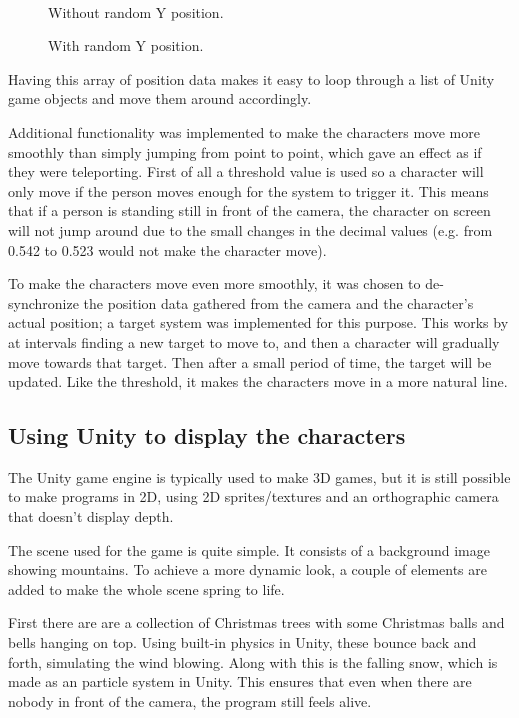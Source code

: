 \begin{figure}[htbp]
\begin{minipage}[b]{0.45\textwidth}
\end{minipage} \\ %
\begin{minipage}[t]{0.45\textwidth}
\caption{Without random Y position.} %
\label{fig:withoutRandomY}
\end{minipage} \hfill
\begin{minipage}[t]{0.45\textwidth}
\caption{With random Y position.} %
\label{fig:withRandomY}
\end{minipage}
\end{figure}

Having this array of position data makes it easy to loop through a list of Unity game objects and move them around accordingly.

Additional functionality was implemented to make the characters move more smoothly than simply jumping from point to point, which gave an effect as if they were teleporting. First of all a threshold value is used so a character will only move if the person moves enough for the system to trigger it. This means that if a person is standing still in front of the camera, the character on screen will not jump around due to the small changes in the decimal values (e.g. from 0.542 to 0.523 would not make the character move).

To make the characters move even more smoothly, it was chosen to de-synchronize the position data gathered from the camera and the character's actual position; a target system was implemented for this purpose. This works by at intervals finding a new target to move to, and then a character will gradually move towards that target. Then after a small period of time, the target will be updated. Like the threshold, it makes the characters move in a more natural line.

\subsection{Using Unity to display the characters}
The Unity game engine is typically used to make 3D games, but it is still possible to make programs in 2D, using 2D sprites/textures and an orthographic camera that doesn't display depth.

The scene used for the game is quite simple. It consists of a background image showing mountains. To achieve a more dynamic look, a couple of elements are added to make the whole scene spring to life.

First there are are a collection of Christmas trees with some Christmas balls and bells hanging on top. Using built-in physics in Unity, these bounce back and forth, simulating the wind blowing. Along with this is the falling snow, which is made as an particle system in Unity. This ensures that even when there are nobody in front of the camera, the program still feels alive.

